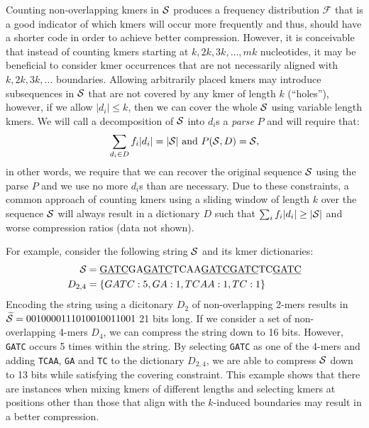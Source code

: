 \documentclass[12pt]{cmuthesis}
\begin{document}
  Counting non-overlapping kmers in $\mathcal{S}$ produces a frequency distribution $\mathcal{F}$ that is a good indicator of which kmers will occur more frequently and thus, should have a shorter code in order to achieve better compression. However, it is conceivable that instead of counting kmers starting at $k, 2k, 3k, \ldots, mk$ nucleotides, it may be beneficial to consider kmer occurrences that are not necessarily aligned with $k, 2k, 3k, \ldots$ boundaries. Allowing arbitrarily placed kmers may introduce subsequences in $\mathcal{S}$ that are not covered by any kmer of length $k$ (``holes''), however, if we allow $|d_i| \leq k$, then we can cover the whole $\mathcal{S}$ using variable length kmers. We will call a decomposition of $\mathcal{S}$ into $d_i$s a \textit{parse} $P$ and will require that:
  \begin{align}
  \label{eqn:constraints}
  \sum_{d_i \in D} f_i |d_i| = |\mathcal{S}|~\textrm{and}~P(\mathcal{S}, D) = \mathcal{S},
  \end{align}
  in other words, we require that we can recover the original sequence $\mathcal{S}$ using the parse $P$ and we use no more $d_i$s than are necessary.
  Due to these constraints, a common approach of counting kmers using a sliding window of length $k$ over the sequence $\mathcal{S}$ will always result in a dictionary $D$ such that $\sum_{i} f_i |d_i| \geq |\mathcal{S}|$ and worse compression ratios (data not shown).


  For example, consider the following string $\mathcal{S}$ and its kmer dictionaries:
  \begin{align*}
    \mathcal{S} &= \textrm{\underline{GATC}GA\underline{GATC}TCAA\underline{GATC}\underline{GATC}TC\underline{GATC}} \\
    D_{2,4} &= \{GATC: 5, GA: 1, TCAA: 1, TC: 1\}
  \end{align*}
  Encoding the string using a dicitonary $D_2$ of non-overlapping 2-mers results in $\widetilde{\mathcal{S}} = 0010000111010010011001$ 21 bits long. If we consider a set of non-overlapping 4-mers $D_4$, we 
  can compress the string down to 16 bits. However, \texttt{GATC} occurs 5 times within the string. By selecting \texttt{GATC} as one of the 4-mers and adding \texttt{TCAA}, \texttt{GA} and \texttt{TC} to the dictionary $D_{2,4}$, we are able to compress $\mathcal{S}$ down to 13 bits while satisfying the covering constraint. This example shows that there are instances when mixing kmers of different lengths and selecting kmers at positions other than those that align with the $k$-induced boundaries may result in a better compression.
\end{document}
